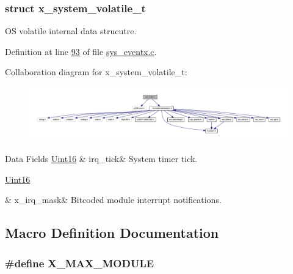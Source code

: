 \subsubsection{struct x\+\_\+system\+\_\+volatile\+\_\+t}
O\+S volatile internal data strucutre. 

Definition at line \hyperlink{a00037_source_l00093}{93} of file \hyperlink{a00037_source}{sys\+\_\+eventx.\+c}.



Collaboration diagram for x\+\_\+system\+\_\+volatile\+\_\+t\+:\nopagebreak
\begin{figure}[H]
\begin{center}
\leavevmode
\includegraphics[width=350pt]{d0/dbc/a01704}
\end{center}
\end{figure}
\begin{DoxyFields}{Data Fields}
\hypertarget{a00037_ab73fa103937ad39e7e2fc55783c4c370}{\hyperlink{a00072_a59a9f6be4562c327cbfb4f7e8e18f08b}{Uint16}}\label{a00037_ab73fa103937ad39e7e2fc55783c4c370}
&
irq\+\_\+tick&
System timer tick. \\
\hline

\hypertarget{a00037_a1385e454a9fbfdfe2af2b8a743789483}{\hyperlink{a00072_a59a9f6be4562c327cbfb4f7e8e18f08b}{Uint16}}\label{a00037_a1385e454a9fbfdfe2af2b8a743789483}
&
x\+\_\+irq\+\_\+mask&
Bitcoded module interrupt notifications. \\
\hline

\end{DoxyFields}


\subsection{Macro Definition Documentation}
\hypertarget{a00037_a04282f21b2fb8a316c5d04a2dfd24eaa}{
\subsubsection[{X\+\_\+\+M\+A\+X\+\_\+\+M\+O\+D\+U\+L\+E}]{\setlength{\rightskip}{0pt plus 5cm}\#define X\+\_\+\+M\+A\+X\+\_\+\+M\+O\+D\+U\+L\+E}}\label{a00037_a04282f21b2fb8a316c5d04a2dfd24eaa}


